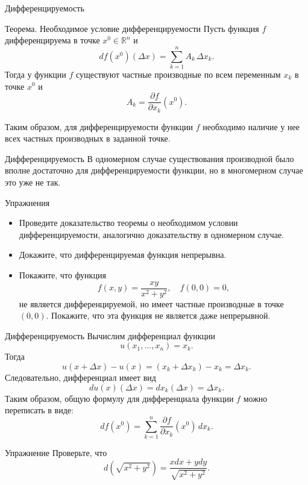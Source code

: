 \documentclass[8pt]{beamer}
\begin{document}
\begin{frame}{Дифференцируемость}
\begin{block}{Теорема. Необходимое условие дифференцируемости}
Пусть функция $f$ дифференцируема в точке $x^0\in\mathbb{R}^n$ и 
$$df\!\left(x^0\right)(\Delta x)  = \sum_{k=1}^n A_k\, \Delta x_k.$$
Тогда у функции $f$ существуют частные производные по всем переменным $x_k$ в точке $x^0$ и
$$A_k = \frac{\partial f}{\partial x_k}\!\left(x^0\right).$$
\end{block}
Таким образом, для дифференцируемости функции $f$ необходимо наличие у нее всех частных производных в заданной точке. 
\end{frame}

\begin{frame}{Дифференцируемость}
В одномерном случае существования производной было вполне достаточно для дифференцируемости функции, но в многомерном случае это уже не так.
\begin{block}{Упражнения}
\begin{itemize}
\item Проведите доказательство теоремы о необходимом условии дифференцируемости, аналогично доказательству в одномерном случае.
\item Докажите, что дифференцируемая функция непрерывна.
\item Покажите, что функция
$$f(x,y) = \frac{xy}{x^2+y^2},\quad f(0,0) = 0,$$
не является дифференцируемой, но имеет частные производные в точке $(0,0)$. Покажите, что эта функция не является даже непрерывной.
\end{itemize}
\end{block}
\end{frame}

\begin{frame}{Дифференцируемость}
Вычислим дифференциал функции 
$$u(x_1,\ldots,x_n) = x_k.$$
Тогда
$$u(x+\Delta x) - u(x) = \left(x_k+\Delta x_k\right) - x_k = \Delta x_k.$$
Следовательно, дифференциал имеет вид
$$du(x)(\Delta x) = dx_k(\Delta x) = \Delta x_k.$$
Таким образом, общую формулу для дифференциала функции $f$ можно переписать в виде:
$$df(x^0) = \sum_{k=1}^n \frac{\partial f}{\partial x_k}\!\left(x^0\right)\, dx_k.$$
\begin{block}{Упражнение}
Проверьте, что
$$d\left(\sqrt{x^2+y^2}\right) = \frac{xdx+ydy}{\sqrt{x^2+y^2}}.$$
\end{block}
\end{frame}
\end{document}
